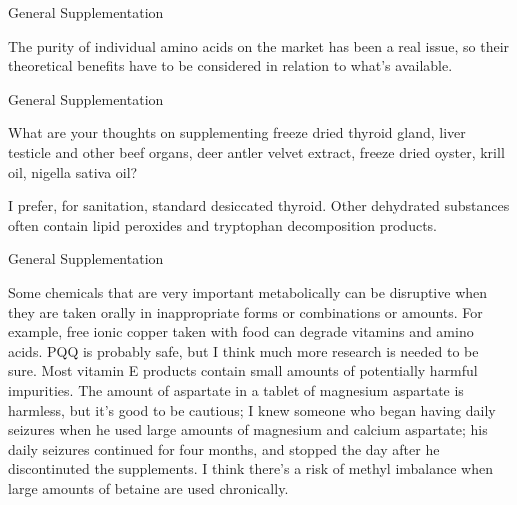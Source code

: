 \documentclass[11pt,oneside,openany,extrafontsizes]{memoir}
\begin{document}
\begin{standalonequote}{General Supplementation}

    \begin{answer}
      The purity of individual amino acids on the market has been a real issue, so their theoretical benefits have to be considered in relation to what's available.
    \end{answer}
\end{standalonequote}

\begin{qaexchange}{General Supplementation}

    \begin{question}
        What are your thoughts on supplementing freeze dried thyroid gland, liver testicle and other beef organs, deer antler velvet extract, freeze dried oyster, krill oil, nigella sativa oil?
    \end{question}

    \begin{answer}
      I prefer, for sanitation, standard desiccated thyroid. Other dehydrated substances often contain lipid peroxides and tryptophan decomposition products.
    \end{answer}
\end{qaexchange}

\begin{standalonequote}{General Supplementation}

    \begin{answer}
      Some chemicals that are very important metabolically can be disruptive when they are taken orally in inappropriate forms or combinations or amounts. For example, free ionic copper taken with food can degrade vitamins and amino acids. PQQ is probably safe, but I think much more research is needed to be sure. Most vitamin E products contain small amounts of potentially harmful impurities. The amount of aspartate in a tablet of magnesium aspartate is harmless, but it's good to be cautious; I knew someone who began having daily seizures when he used large amounts of magnesium and calcium aspartate; his daily seizures continued for four months, and stopped the day after he discontinuted the supplements. I think there's a risk of methyl imbalance when large amounts of betaine are used chronically.
    \end{answer}
\end{standalonequote}
\end{document}
